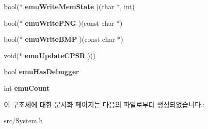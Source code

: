 \begin{DoxyCompactItemize}
bool($\ast$ {\bfseries emu\+Write\+Mem\+State} )(char $\ast$, int)
\item 
\mbox{\label{struct_emulated_system_a741364ed335ac65cc30c6749896274bc}} 
bool($\ast$ {\bfseries emu\+Write\+P\+NG} )(const char $\ast$)
\item 
\mbox{\label{struct_emulated_system_a3196ed548c01811a8c482294d68ec56b}} 
bool($\ast$ {\bfseries emu\+Write\+B\+MP} )(const char $\ast$)
\item 
\mbox{\label{struct_emulated_system_a68f7f4e7c67eede19c75eb85ebe805c2}} 
void($\ast$ {\bfseries emu\+Update\+C\+P\+SR} )()
\item 
\mbox{\label{struct_emulated_system_a3c90818d1108c9f7370a388419344362}} 
bool {\bfseries emu\+Has\+Debugger}
\item 
\mbox{\label{struct_emulated_system_a4241c0057d935ae757508f26be9b37ad}} 
int {\bfseries emu\+Count}
\end{DoxyCompactItemize}


이 구조체에 대한 문서화 페이지는 다음의 파일로부터 생성되었습니다.\+:\begin{DoxyCompactItemize}
\item 
src/System.\+h\end{DoxyCompactItemize}

